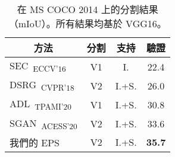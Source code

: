 \begin{table}[]
\centering
{\small
\begin{tabular}{@{}lccc@{}}
\toprule
\multicolumn{1}{c}{方法} & 分割 & 支持 & \multicolumn{1}{c}{驗證} \\ \midrule
\multicolumn{1}{l}{SEC~\cite{kolesnikov2016seed}\textsubscript{ECCV'16}} & V1 & I. & \multicolumn{1}{c}{22.4} \\
\multicolumn{1}{l}{DSRG~\cite{huang2018weakly}\textsubscript{CVPR'18}} & V2 & I.+S. & \multicolumn{1}{c}{26.0} \\
\multicolumn{1}{l}{ADL~\cite{choe2020attention}\textsubscript{TPAMI'20}} & V1 & I.+S. & \multicolumn{1}{c}{30.8} \\
\multicolumn{1}{l}{SGAN~\cite{yao2020saliency}\textsubscript{ACESS'20}} & V2 & I.+S. & \multicolumn{1}{c}{33.6} \\ \midrule
\multicolumn{1}{l}{我們的 EPS} & V2 & I.+S. & \multicolumn{1}{c}{\textbf{35.7}} \\ \bottomrule
\end{tabular}
}
\vspace{2mm}
\caption{在 MS COCO 2014 上的分割結果（mIoU）。所有結果均基於 VGG16。}\vspace{-2mm}
\label{tab:seg_quantitative_coco}
\end{table}
